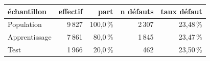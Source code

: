 \begin{tabular}{lrrrr}
\toprule
\textbf{échantillon} & \textbf{effectif} & \textbf{part} & \textbf{n défauts} & \textbf{taux défaut} \\
\midrule
Population & 9\,827 & 100,0\,\% & 2\,307 & 23,48\,\% \\
Apprentissage & 7\,861 & 80,0\,\% & 1\,845 & 23,47\,\% \\
Test & 1\,966 & 20,0\,\% & 462 & 23,50\,\% \\
\bottomrule
\end{tabular}
